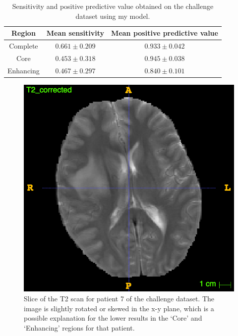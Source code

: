 \documentclass[12pt,a4paper,twoside,openright]{report}
\begin{document}
\begin{table}
\centering	
\begin{tabular}{ c | c | c} 
\textbf{Region} & \textbf{Mean sensitivity } & \textbf{Mean positive predictive value} \\
\hline
Complete &	$0.661 \pm 0.209$ & $0.933 \pm 0.042$ \\
Core & 		$0.453 \pm 0.318$ & $0.945 \pm 0.038$ \\
Enhancing & $0.467 \pm 0.297$ & $0.840 \pm 0.101$ \\
\end{tabular}
\caption{Sensitivity and positive predictive value obtained on the challenge dataset using my model.}
\label{table:my_model_sensitivity_ppv}
\end{table}

\begin{figure}[h]
	\centering
	\includegraphics[scale = 0.3]{patient7_t2}
	\caption[Slice of the T2 scan for patient 7 of the challenge dataset.]{Slice of the T2 scan for patient 7 of the challenge dataset. The image is slightly rotated or skewed in the x-y plane, which is a possible explanation for the lower results in the `Core' and `Enhancing' regions for that patient.}
	\label{fig:patient_7_t2}
\end{figure}
\end{document}
